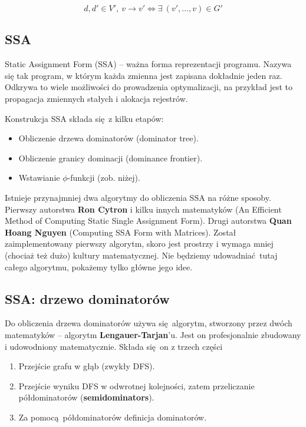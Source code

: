 		$$d, d' \in V', \ v \rightarrow v' \iff \exists \ (v', ..., v) \in G' $$

		\subsection{SSA}
			Static Assignment Form (SSA) -- ważna forma reprezentacji programu. Nazywa się
			tak program, w którym każda zmienna jest zapisana dokładnie jeden raz. Odkrywa
			to wiele możliwości do prowadzenia optymalizacji, na przykład jest to propagacja
			 zmiennych stałych i alokacja rejestrów.

			Konstrukcja SSA składa się z kilku etapów:
			\begin{itemize}
				\item Obliczenie drzewa dominatorów (dominator tree).
				\item Obliczenie granicy dominacji (dominance frontier).
				\item Wstawianie $\phi$-funkcji (zob. niżej).
			\end{itemize}
			Istnieje przynajmniej dwa algorytmy do obliczenia SSA na różne sposoby. Pierwszy
			autorstwa \textbf{Ron Cytron} i kilku innych matematyków (An Efficient
			Method of Computing Static Single Assignment Form). Drugi autorstwa
			\textbf{Quan Hoang Nguyen} (Computing SSA Form with Matrices). Został
			zaimplementowany pierwszy algorytm, skoro jest prostrzy i wymaga mniej (chociaż
			też dużo) kultury matematycznej. Nie będziemy udowadniać tutaj całego algorytmu,
			pokażemy tylko główne jego idee.
			
			\subsection{SSA: drzewo dominatorów}
				Do obliczenia drzewa dominatorów używa się algorytm, stworzony przez dwóch
				matematyków -- algorytm \textbf{Lengauer-Tarjan}'u. Jest on profesjonalnie
				zbudowany i udowodniony matematycznie. Składa się on z trzech części
				\begin{enumerate}
					\item Przejście grafu w głąb (zwykły DFS).
					\item Przejście wyniku DFS w odwrotnej kolejności, zatem przeliczanie
					      półdominatorów (\textbf{semidominators}).
			      	\item Za pomocą półdominatorów definicja dominatorów.
				\end{enumerate}

				\spacing

